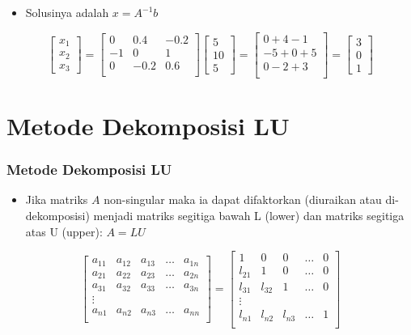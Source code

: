 \documentclass[pdflatex,compress,mathserif]{beamer}
\begin{document}
\begin{frame}
	\begin{itemize}
		\item Solusinya adalah $ x = A^{-1}b $
	\end{itemize}
	\[
		\begin{bmatrix}
		x_1\\ x_2 \\ x_3
		\end{bmatrix}
		=
		\begin{bmatrix}
			0 & 0.4 & -0.2 \\
			-1 & 0 & 1 \\
			0 & -0.2 & 0.6 \\
		\end{bmatrix}
		\begin{bmatrix}
		5 \\ 10 \\ 5
		\end{bmatrix}
		=
		\begin{bmatrix}
		0 + 4 -1 \\
		-5 + 0 + 5 \\
		0 - 2 + 3 \\
		\end{bmatrix}
		=
		\begin{bmatrix}
		3 \\ 0 \\ 1
		\end{bmatrix}
	\]
\end{frame}

\section{Metode Dekomposisi LU}

\begin{frame}
	\frametitle{Metode Dekomposisi LU}
	\begin{itemize}
		\item Jika matriks $ A $ non-singular maka ia dapat difaktorkan (diuraikan atau di-dekomposisi) menjadi matriks segitiga bawah L (lower) dan matriks segitiga atas U (upper):
		$ A = LU $
	\end{itemize}
	\[
	\begin{bmatrix}
		a_{11} & a_{12} & a_{13} & \dots & a_{1n} \\
		a_{21} & a_{22} & a_{23} & \dots & a_{2n} \\
		a_{31} & a_{32} & a_{33} & \dots & a_{3n} \\
		\vdots \\
		a_{n1} & a_{n2} & a_{n3} & \dots & a_{nn} \\
	\end{bmatrix}
	=
	\begin{bmatrix}
		1 & 0 & 0 & \dots & 0 \\
		l_{21} & 1 & 0 & \dots & 0 \\
		l_{31} & l_{32} & 1 & \dots & 0 \\
		\vdots \\
		l_{n1} & l_{n2} & l_{n3} & \dots & 1 \\
	\end{bmatrix}
	\]
\end{frame}
\end{document}
